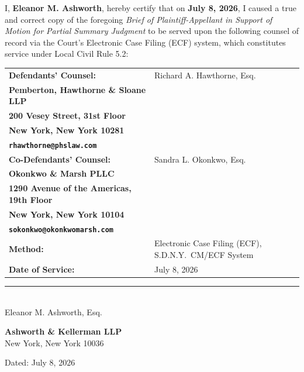 \documentclass[12pt,letterpaper]{article}
\newcommand{\sigline}[1]{%
  \vspace{8pt}%
  \noindent\rule{2.8in}{0.4pt}\\[-2pt]
  {\small\color{midgray}#1}%
}
\newcommand{\kvrow}[2]{%
  {\color{accent}\bfseries #1} & #2 \\[2pt]%
}
\begin{document}
\begin{certblock}

\noindent I, \textbf{Eleanor M. Ashworth}, hereby certify that on \textbf{July 8, 2026}, I caused a true and correct copy of the foregoing \textit{Brief of Plaintiff-Appellant in Support of Motion for Partial Summary Judgment} to be served upon the following counsel of record via the Court's Electronic Case Filing (ECF) system, which constitutes service under Local Civil Rule 5.2:

\vspace{10pt}

\begin{tabularx}{\linewidth}{@{}>{\color{accent}\bfseries}l@{\hspace{8mm}}>{\raggedright\arraybackslash}X@{}}
  \kvrow{Defendants' Counsel:}{
    Richard A. Hawthorne, Esq.\\
    Pemberton, Hawthorne \& Sloane LLP\\
    200 Vesey Street, 31st Floor\\
    New York, New York 10281\\
    \texttt{rhawthorne@phslaw.com}
  }
  \kvrow{Co-Defendants' Counsel:}{
    Sandra L. Okonkwo, Esq.\\
    Okonkwo \& Marsh PLLC\\
    1290 Avenue of the Americas, 19th Floor\\
    New York, New York 10104\\
    \texttt{sokonkwo@okonkwomarsh.com}
  }
  \kvrow{Method:}{Electronic Case Filing (ECF), S.D.N.Y.\ CM/ECF System}
  \kvrow{Date of Service:}{July 8, 2026}
\end{tabularx}

\end{certblock}

\vspace{20pt}

\sigline{Eleanor M. Ashworth, Esq.}

\vspace{6pt}

\noindent\textbf{Ashworth \& Kellerman LLP}\\
New York, New York 10036

\vspace{4pt}
\noindent Dated: July 8, 2026
\end{document}
